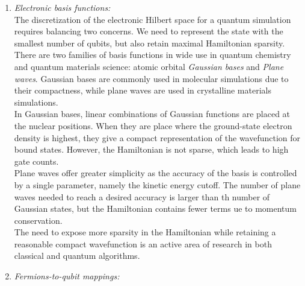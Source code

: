 \documentclass{book}
\theoremstyle{definition}
\begin{document}
\begin{enumerate}
	
	
	
	
	
	
	\item \textit{Electronic basis functions:}\\
	
	The discretization of the electronic Hilbert space for a quantum simulation requires balancing two concerns. We need to represent the state with the smallest number of qubits, but also retain maximal Hamiltonian sparsity. \\
	
	There are two families of basis functions in wide use in quantum chemistry and quantum materials science: atomic orbital \textit{Gaussian bases} and \textit{Plane waves}. Gaussian bases are commonly used in molecular simulations due to their compactness, while plane waves are used in crystalline materials simulations. \\
	
	In Gaussian bases, linear combinations of Gaussian functions are placed at the nuclear positions. When they are place where the ground-state electron density is highest, they give a compact representation of the wavefunction for bound states. However, the Hamiltonian is not sparse, which leads to high gate counts. \\
	
	Plane waves offer greater simplicity as the accuracy of the basis is controlled by a single parameter, namely the kinetic energy cutoff. The number of plane waves needed to reach a desired accuracy is larger than th number of Gaussian states, but the Hamiltonian contains fewer terms ue to momentum conservation. \\
	
	The need to expose more sparsity in the Hamiltonian while retaining a reasonable compact wavefunction is an active area of research in both classical and quantum algorithms.  
	
	
	\item \textit{Fermions-to-qubit mappings:}\\
	

\end{enumerate}
\end{document}
